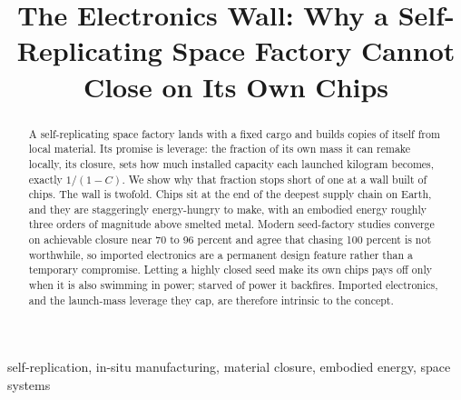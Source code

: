\documentclass[conference]{IEEEtran}
\title{The Electronics Wall: Why a Self-Replicating Space Factory Cannot Close on Its Own Chips}
\author{
\IEEEauthorblockN{Noah Hyd\'en}
\IEEEauthorblockA{Independent researcher \\ ORCID: 0009-0003-4523-0467}
}
\begin{document}
\maketitle


\begin{abstract}
A self-replicating space factory lands with a fixed cargo and builds copies of
itself from local material. Its promise is leverage: the fraction of its own mass
it can remake locally, its closure, sets how much installed capacity each launched
kilogram becomes, exactly $1/(1-C)$. We show why that fraction stops short of one at
a wall built of chips. The wall is twofold. Chips sit at the end of the deepest
supply chain on Earth, and they are staggeringly energy-hungry to make, with an
embodied energy roughly three orders of magnitude above smelted metal. Modern
seed-factory studies converge on achievable closure near 70 to 96 percent and agree
that chasing 100 percent is not worthwhile, so imported electronics are a permanent
design feature rather than a temporary compromise. Letting a highly closed seed make
its own chips pays off only when it is also swimming in power; starved of power it
backfires. Imported electronics, and the launch-mass leverage they cap, are
therefore intrinsic to the concept.
\end{abstract}

\begin{IEEEkeywords}
self-replication, in-situ manufacturing, material closure, embodied energy, space systems
\end{IEEEkeywords}










\end{document}
